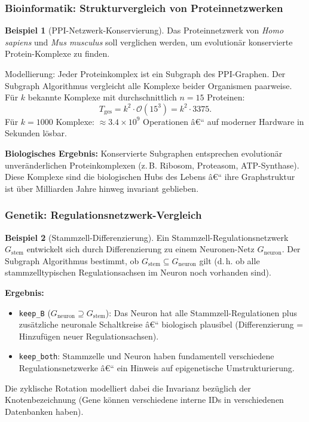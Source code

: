 ﻿\documentclass[12pt,a4paper,twoside]{article}
\theoremstyle{definition}
\newtheorem{beispiel}{Beispiel}[section]
\theoremstyle{plain}
\theoremstyle{remark}
\begin{document}
\subsubsection{Bioinformatik: Strukturvergleich von Proteinnetzwerken}

\begin{beispiel}[PPI-Netzwerk-Konservierung]
Das Proteinnetzwerk von \emph{Homo sapiens} und
\emph{Mus musculus} soll verglichen werden, um
evolutionär konservierte Protein-Komplexe zu finden.

Modellierung: Jeder Proteinkomplex ist ein Subgraph
des PPI-Graphen.  Der Subgraph Algorithmus vergleicht
alle Komplexe beider Organismen paarweise.  Für $k$
bekannte Komplexe mit durchschnittlich $n = 15$ Proteinen:
\[
  T_{\text{ges}} = k^2 \cdot \mathcal{O}(15^3)
                = k^2 \cdot 3375.
\]
Für $k = 1000$ Komplexe: $\approx 3.4 \times 10^9$
Operationen â€“ auf moderner Hardware in Sekunden lösbar.

\textbf{Biologisches Ergebnis:} Konservierte Subgraphen
entsprechen evolutionär unveränderlichen Proteinkomplexen
(z.\,B. Ribosom, Proteasom, ATP-Synthase).  Diese
Komplexe sind die biologischen Hubs des Lebens â€“
ihre Graphstruktur ist über Milliarden Jahre hinweg
invariant geblieben.
\end{beispiel}

\subsubsection{Genetik: Regulationsnetzwerk-Vergleich}

\begin{beispiel}[Stammzell-Differenzierung]
Ein Stammzell-Regulationsnetzwerk $G_{\text{stem}}$ entwickelt
sich durch Differenzierung zu einem Neuronen-Netz
$G_{\text{neuron}}$.  Der Subgraph Algorithmus bestimmt,
ob $G_{\text{stem}} \subseteq G_{\text{neuron}}$ gilt
(d.\,h. ob alle stammzelltypischen Regulationsachsen
im Neuron noch vorhanden sind).

\textbf{Ergebnis:}
\begin{itemize}
  \item \texttt{keep\_B} ($G_{\text{neuron}} \supseteq G_{\text{stem}}$):
        Das Neuron hat alle Stammzell-Regulationen plus
        zusätzliche neuronale Schaltkreise â€“ biologisch
        plausibel (Differenzierung = Hinzufügen neuer
        Regulationsachsen).
  \item \texttt{keep\_both}: Stammzelle und Neuron haben
        fundamentell verschiedene Regulationsnetzwerke â€“
        ein Hinweis auf epigenetische Umstrukturierung.
\end{itemize}
Die zyklische Rotation modelliert dabei die Invarianz
bezüglich der Knotenbezeichnung (Gene können verschiedene
interne IDs in verschiedenen Datenbanken haben).
\end{beispiel}
\end{document}
